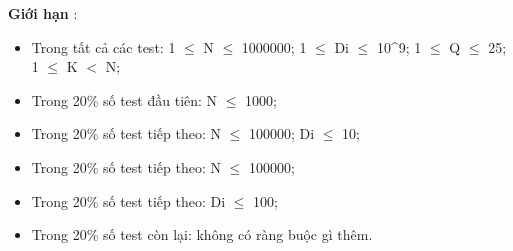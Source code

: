 \textbf{    Giới hạn   }   :  
\begin{itemize}
	\item     Trong tất cả các test: 1  $\le$  N  $\le$  1000000; 1  $\le$  Di  $\le$  10^9; 1  $\le$  Q  $\le$  25; 1  $\le$  K $<$ N;   
	\item     Trong 20\% số test đầu tiên: N  $\le$  1000;   
	\item     Trong 20\% số test tiếp theo: N  $\le$  100000; Di  $\le$  10;   
	\item     Trong 20\% số test tiếp theo: N  $\le$  100000;   
	\item     Trong 20\% số test tiếp theo: Di  $\le$  100;   
	\item     Trong 20\% số test còn lại: không có ràng buộc gì thêm.   
\end{itemize}


